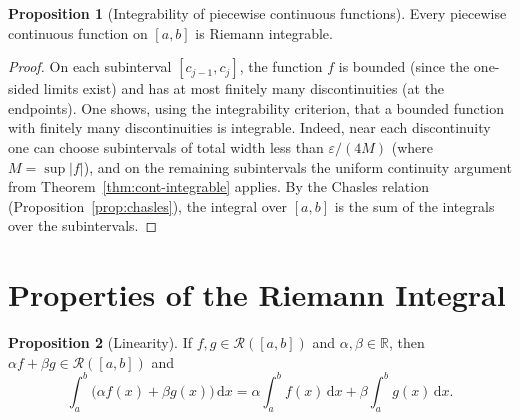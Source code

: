 \documentclass[12pt,a4paper]{book}
\theoremstyle{definition}
\newtheorem{proposition}{Proposition}[chapter]
\newcommand{\R}{\mathbb{R}}
\newcommand{\eps}{\varepsilon}
\newcommand{\abs}[1]{\left\lvert #1 \right\rvert}
\newcommand{\dd}{\,\mathrm{d}}
\begin{document}
\begin{proposition}[Integrability of piecewise continuous functions]\label{prop:piecewise-int}
  Every piecewise continuous function on $[a,b]$ is Riemann integrable.
\end{proposition}

\begin{proof}
  On each subinterval $[c_{j-1},c_j]$, the function $f$ is bounded
  (since the one-sided limits exist) and has at most finitely many
  discontinuities (at the endpoints).  One shows, using the integrability
  criterion, that a bounded function with finitely many discontinuities
  is integrable.  Indeed, near each discontinuity one can choose
  subintervals of total width less than $\eps/(4M)$ (where
  $M=\sup\abs{f}$), and on the remaining subintervals the uniform
  continuity argument from Theorem~\ref{thm:cont-integrable} applies.
  By the Chasles relation (Proposition~\ref{prop:chasles}), the integral
  over $[a,b]$ is the sum of the integrals over the subintervals.
\end{proof}


\section{Properties of the Riemann Integral}\label{sec:int-properties}

\begin{proposition}[Linearity]\label{prop:linearity}
  If $f,g\in\mathcal{R}([a,b])$ and $\alpha,\beta\in\R$, then
  $\alpha f+\beta g\in\mathcal{R}([a,b])$ and
  \[
    \int_a^b\bigl(\alpha f(x)+\beta g(x)\bigr)\dd x
    = \alpha\int_a^b f(x)\dd x + \beta\int_a^b g(x)\dd x.
  \]
\end{proposition}
\end{document}
